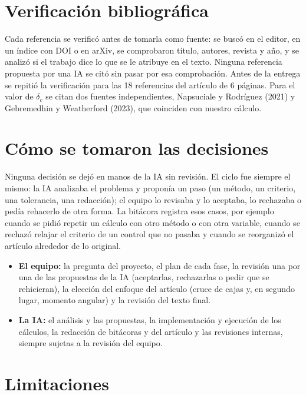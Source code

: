 \documentclass[10pt,letterpaper]{article}
\begin{document}
\section{Verificación bibliográfica}

Cada referencia se verificó antes de tomarla como fuente: se buscó en el editor, en un índice con DOI o en arXiv, se comprobaron título, autores, revista y año, y se analizó si el trabajo dice lo que se le atribuye en el texto. Ninguna referencia propuesta por una IA se citó sin pasar por esa comprobación. Antes de la entrega se repitió la verificación para las 18 referencias del artículo de 6 páginas. Para el valor de $\delta_c$ se citan dos fuentes independientes, Napsuciale y Rodríguez (2021) y Gebremedhin y Weatherford (2023), que coinciden con nuestro cálculo.

\section{Cómo se tomaron las decisiones}

Ninguna decisión se dejó en manos de la IA sin revisión. El ciclo fue siempre el mismo: la IA analizaba el problema y proponía un paso (un método, un criterio, una tolerancia, una redacción); el equipo lo revisaba y lo aceptaba, lo rechazaba o pedía rehacerlo de otra forma. La bitácora registra esos casos, por ejemplo cuando se pidió repetir un cálculo con otro método o con otra variable, cuando se rechazó relajar el criterio de un control que no pasaba y cuando se reorganizó el artículo alrededor de lo original.

\begin{itemize}[leftmargin=*]
\item \textbf{El equipo:} la pregunta del proyecto, el plan de cada fase, la revisión una por una de las propuestas de la IA (aceptarlas, rechazarlas o pedir que se rehicieran), la elección del enfoque del artículo (cruce de cajas y, en segundo lugar, momento angular) y la revisión del texto final.
\item \textbf{La IA:} el análisis y las propuestas, la implementación y ejecución de los cálculos, la redacción de bitácoras y del artículo y las revisiones internas, siempre sujetas a la revisión del equipo.
\end{itemize}

\section{Limitaciones}
\end{document}
